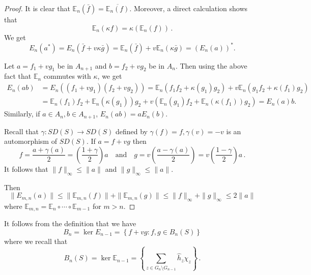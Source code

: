 \documentclass[12pt,reqno]{amsart}
\numberwithin{equation}{section}
\newcommand{\E}{{\mathbb E}}
\begin{document}
\begin{proof}
It is clear that $\E_n(\bar{f}) = \overline{\E_n(f)}$.  Moreover, a direct calculation shows that 
\begin{equation*}
\E_n(\kappa f)=\kappa(\E_n(f))\,.
\end{equation*}
We get
\begin{equation*}
E_n(a^*)=E_n(\bar{f}+v\kappa \bar{g}) = \E_n(\bar{f}) + v\E_n(\kappa \bar{g}) = \left(E_n(a)\right)^*.
\end{equation*}

Let $a=f_1+vg_1$ be in $A_{n+1}$ and $b=f_2+vg_2$ be in $A_n$.  Then using the above fact that $\E_n$ commutes with $\kappa$, we get
\begin{equation*}
\begin{aligned}
E_n(ab) &= E_n\left((f_1+vg_1)(f_2+vg_2)\right) 
= \E_n\left(f_1 f_2 + \kappa(g_1)g_2\right)+v\E_n\left(g_1 f_2 + \kappa(f_1)g_2\right) \\
&= \E_n(f_1)f_2 + \E_n(\kappa(g_1))g_2 + v\left(\E_n(g_1)f_2+\E_n(\kappa(f_1))g_2\right) = E_n(a)b.
\end{aligned}
\end{equation*}
Similarly, if $a\in A_{n}, b\in A_{n+1}$, $E_n(ab)=aE_n(b)$.

Recall that $\gamma:SD(S)\to SD(S)$ defined by $\gamma(f)=f, \gamma(v)=-v$ is an automorphism of $SD(S)$.  If $a=f+vg$ then 
\begin{equation*}
f=\frac{a+\gamma(a)}{2} = \left(\frac{1+\gamma}{2}\right)a\quad\textrm{and}\quad g = v\left(\frac{a-\gamma(a)}{2}\right) = v\left(\frac{1-\gamma}{2}\right)a\,.
\end{equation*}
It follows that $\|f\|_\infty\le \|a\|$ and $\|g\|_\infty\le \|a\|$. 

Then
\begin{equation*}
\|E_{m,n}(a)\| \le \|\E_{m,n}(f)\| + \|\E_{m,n}(g)\| \le \|f\|_\infty+\|g\|_\infty \le 2\|a\|
\end{equation*}
where $\E_{m,n}=\E_n\circ\cdots\circ \E_{m-1}$ for $m>n$.
\end{proof}

It follows from the definition that we have 
\begin{equation*}
B_n=\ker E_{n-1} = \left\{f+vg : f,g\in B_n(S)\right\}
\end{equation*}
where we recall that \begin{equation*}
B_n(S) = \ker \E_{n-1} = \left\{\sum_{z\in G_n\setminus G_{n-1}} \hat{h}_z\chi_z\right\}\,.
\end{equation*}
\end{document}
